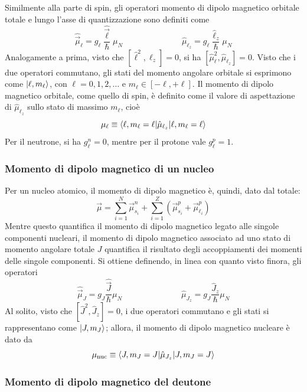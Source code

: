 \documentclass[11pt, a4paper]{scrartcl}
\theoremstyle{style}
\numberwithin{equation}{subsection}
\begin{document}
Similmente alla parte di spin, gli operatori momento di dipolo magnetico orbitale totale e lungo l'asse di quantizzazione sono definiti come
\[
\hat{\vec{\mu }}_\ell  = g_\ell \frac{\hat{\vec{\ell }}}{\hbar }\mu _N \hspace{3cm} \hat{\mu }_{\ell _z} = g_\ell  \frac{\hat{\ell}_z}{\hbar }\mu _N
\] 
Analogamente a prima, visto che $[\hat{\ell }^2 , \ell _z] =0$, si ha $[\hat{\mu }_\ell ^2 , \hat{\mu }_{\ell _z}]=0$.
Visto che i due operatori commutano, gli stati del momento angolare orbitale si esprimono come $\ket{\ell , m_\ell } $, con $\ell = 0, 1 , 2, \ldots$ e $m_\ell  \in [-\ell ,+\ell ]$.
Il momento di dipolo magnetico orbitale, come quello di spin, \`e definito come il valore di aspettazione di $\hat{\mu }_{\ell _z}$ sullo stato di massimo $m_\ell $, cio\`e
\[
\mu _\ell  \equiv \braket{\ell , m_\ell =\ell |\hat{\mu }_{\ell _z}|\ell , m_\ell =\ell } 
\] 
Per il neutrone, si ha $g_\ell ^n =0$, mentre per il protone vale $g_\ell ^p=1$.

\subsubsection{Momento di dipolo magnetico di un nucleo}

Per un nucleo atomico, il momento di dipolo magnetico \`e, quindi, dato dal totale:
\[
\vec{\mu } = \sum_{i=1}^{N} \vec{\mu }_{s_i}^n + \sum_{i=1}^{Z} \left(\vec{\mu }_{s_i}^p + \vec{\mu }_{\ell _i}^p\right) 
\] 
Mentre questo quantifica il momento di dipolo magnetico legato alle singole componenti nucleari, il momento di dipolo magnetico associato ad uno stato di momento angolare totale $J$ quantifica il risultato degli accoppiamenti dei momenti delle singole componenti.
Si ottiene definendo, in linea con quanto visto finora, gli operatori
\[
\hat{\vec{\mu }}_J = g_J \frac{\hat{\vec{J}}}{\hbar }\mu _N \hspace{3cm} \hat{\mu }_{J_z} = g_J \frac{\hat{J}_z}{ \hbar } \mu _N
\] 
Al solito, visto che $[\hat{J}^2 , \hat{J}_z] =0$, i due operatori commutano e gli stati si rappresentano come $\ket{J , m_J} $; allora, il momento di dipolo magnetico nucleare \`e dato da 
\begin{equation}
	\mu _\text{nuc} \equiv \braket{J , m_J = J | \hat{\mu }_{J_z}|J , m_J = J} 
\end{equation}

\subsubsection{Momento di dipolo magnetico del deutone}
\end{document}
